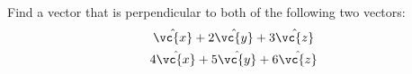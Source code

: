 Find a vector that is perpendicular to both of the following two vectors:
        \begin{gather*}
          \hat{\vc{x}}+2\hat{\vc{y}}+3\hat{\vc{z}} \\
          4\hat{\vc{x}}+5\hat{\vc{y}}+6\hat{\vc{z}} 
        \end{gather*}
\answercheck

